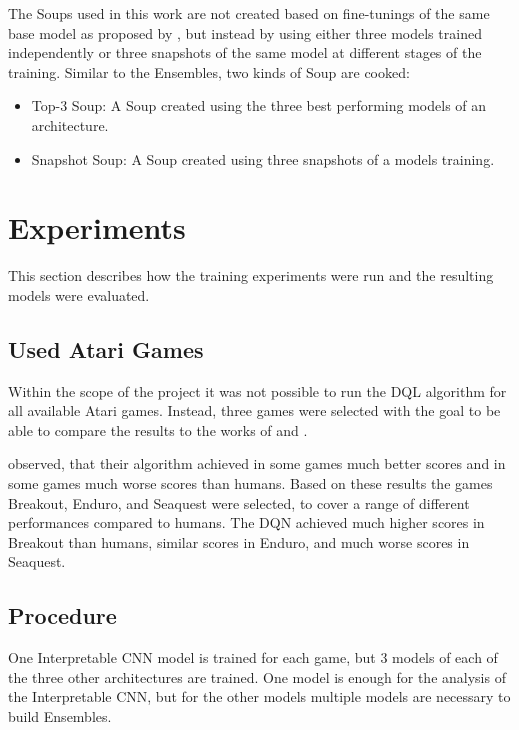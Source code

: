 The Soups used in this work are not created based on fine-tunings of the same base model as proposed by \textcite{wortsman_model_2022}, but instead by using either three models trained independently or three snapshots of the same model at different stages of the training. Similar to the Ensembles, two kinds of Soup are cooked:

\begin{itemize}
	\item Top-3 Soup: A Soup created using the three best performing models of an architecture.
	\item Snapshot Soup: A Soup created using three snapshots of a models training.
\end{itemize}


\chapter{Experiments}

This section describes how the training experiments were run and the resulting models were evaluated.

\section{Used Atari Games}

Within the scope of the project it was not possible to run the DQL algorithm for all available Atari games. Instead, three games were selected with the goal to be able to compare the results to the works of \textcite{mnih_playing_2013} and \textcite{mnih_human-level_2015}.

\textcite{mnih_playing_2013} observed, that their algorithm achieved in some games much better scores and in some games much worse scores than humans. Based on these results the games Breakout, Enduro, and Seaquest were selected, to cover a range of different performances compared to humans. The DQN achieved much higher scores in Breakout than humans, similar scores in Enduro, and much worse scores in Seaquest.

\section{Procedure}
One Interpretable CNN model is trained for each game, but 3 models of each of the three other architectures are trained. One model is enough for the analysis of the Interpretable CNN, but for the other models multiple models are necessary to build Ensembles.


